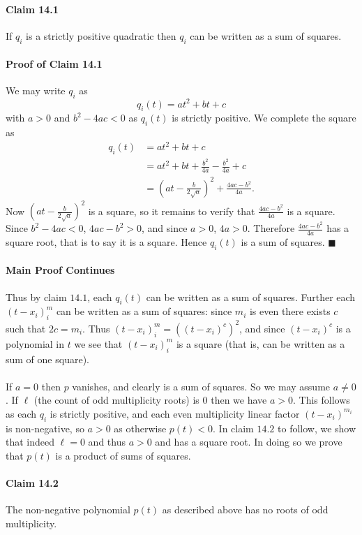 \documentclass[letterpaper,12pt,oneside,onecolumn]{article}
\newcommand{\1}{\mathbbm{1}}
\begin{document}
\paragraph{Claim 14.1}
If $q_i$ is a strictly positive quadratic then $q_i$ can be written as a sum of squares.
\paragraph{Proof of Claim 14.1}
We may write $q_i$ as
$$q_i(t) = at^2 + bt + c$$
with $a > 0$ and $b^2 - 4ac < 0$ as $q_i(t)$ is strictly positive.	We complete the square as
\begin{align*}
q_i(t) &= at^2 + bt + c \\
&= at^2 + bt +\frac{b^2}{4a} - \frac{b^2}{4a} + c \\
&= (at - \frac{b}{2\sqrt{a}})^2 + \frac{4ac - b^2}{4a}.
\end{align*}
Now $(at - \frac{b}{2\sqrt{a}})^2$ is a square, so it remains to verify that $\frac{4ac - b^2}{4a}$ is a square. Since $b^2 - 4ac < 0$, $4ac - b^2 > 0$, and since $a> 0$, $4a>0$. Therefore $\frac{4ac - b^2}{4a}$ has a square root, that is to say it is a square. Hence $q_i(t)$ is a sum of squares. $\blacksquare$
\paragraph{Main Proof Continues}
Thus by claim $14.1$, each $q_i(t)$ can be written as a sum of squares. Further each $(t-x_i)^m_i$ can be written as a sum of squares: since $m_i$ is even there exists $c$ such that $2c = m_i$. Thus $(t-x_i)^m_i = ((t-x_i)^c)^2$, and since $(t-x_i)^c$ is a polynomial in $t$ we see that $(t-x_i)^m_i$ is a square (that is, can be written as a sum of one square).
\paragraph{}
If $a = 0$ then $p$ vanishes, and clearly is a sum of squares. So we may assume $a \neq 0$. If $\ell$ (the count of odd multiplicity roots) is $0$ then we have $a > 0$. This follows as each $q_i$ is strictly positive, and each even multiplicity linear factor $(t-x_i)^{m_i}$ is non-negative, so $a>0$ as otherwise $p(t) <0$. In claim $14.2$ to follow, we show that indeed $\ell = 0$ and thus $a > 0$ and has a square root. In doing so we prove that $p(t)$ is a product of sums of squares.
\paragraph{Claim 14.2}
The non-negative polynomial $p(t)$ as described above has no roots of odd multiplicity.
\end{document}
